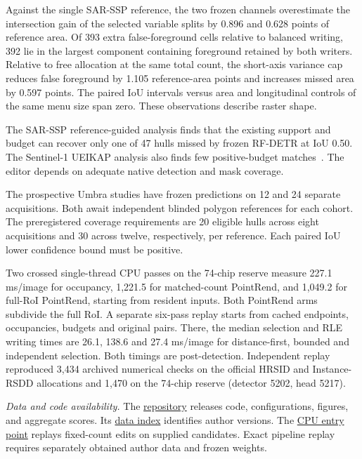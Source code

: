 Against the single SAR-SSP reference, the two frozen channels overestimate the intersection gain of the selected variable splits by 0.896 and 0.628 points of reference area. Of 393 extra false-foreground cells relative to balanced writing, 392 lie in the largest component containing foreground retained by both writers. Relative to free allocation at the same total count, the short-axis variance cap reduces false foreground by 1.105 reference-area points and increases missed area by 0.597 points. The paired IoU intervals versus area and longitudinal controls of the same menu size span zero. These observations describe raster shape.

The SAR-SSP reference-guided analysis finds that the existing support and budget can recover only one of 47 hulls missed by frozen RF-DETR at IoU 0.50. The Sentinel-1 UEIKAP analysis also finds few positive-budget matches~\cite{ueikap}. The editor depends on adequate native detection and mask coverage.

The prospective Umbra studies have frozen predictions on 12 and 24 separate acquisitions. Both await independent blinded polygon references for each cohort. The preregistered coverage requirements are 20 eligible hulls across eight acquisitions and 30 across twelve, respectively, per reference. Each paired IoU lower confidence bound must be positive.

Two crossed single-thread CPU passes on the 74-chip reserve measure 227.1 ms/image for occupancy, 1,221.5 for matched-count PointRend, and 1,049.2 for full-RoI PointRend, starting from resident inputs. Both PointRend arms subdivide the full RoI. A separate six-pass replay starts from cached endpoints, occupancies, budgets and original pairs. There, the median selection and RLE writing times are 26.1, 138.6 and 27.4 ms/image for distance-first, bounded and independent selection. Both timings are post-detection. Independent replay reproduced 3,434 archived numerical checks on the official HRSID and Instance-RSDD allocations and 1,470 on the 74-chip reserve (detector 5202, head 5217).

\textit{Data and code availability.} The \href{https://github.com/bingzhi495-creator/SAR-SEAL-research}{repository} releases code, configurations, figures, and aggregate scores. Its \href{https://github.com/bingzhi495-creator/SAR-SEAL-research/blob/main/docs/DATA_ACCESS.md}{data index} identifies author versions. The \href{https://github.com/bingzhi495-creator/SAR-SEAL-research/blob/main/research_round_20260925_global/code/RFDETR_MATCHED_POINT_REFINEMENT_20261120/README_FIXED_COUNT.md}{CPU entry point} replays fixed-count edits on supplied candidates. Exact pipeline replay requires separately obtained author data and frozen weights.
